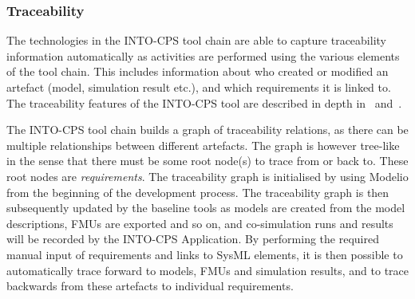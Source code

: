 \subsubsection{Traceability}
\label{sec:method:trace}

The technologies in the INTO-CPS tool chain are able to capture traceability information automatically as activities are performed using the various elements of the tool chain. This includes information about who created or modified an artefact (model, simulation result etc.), and which requirements it is linked to. The traceability features of the INTO-CPS tool are described in depth in~\cite{Pierce&18} and~\cite{Larsen&18a}.


The INTO-CPS tool chain builds a graph of traceability relations, as there can be multiple relationships between different artefacts. The graph is however tree-like in the sense that there must be some root node(s) to trace from or back to. These root nodes are \emph{requirements}. The traceability graph is initialised by using Modelio from the beginning of the development process. The traceability graph is then subsequently updated by the baseline tools as models are created from the model descriptions, FMUs are exported and so on, and co-simulation runs and results will be recorded by the INTO-CPS Application. By performing the required manual input of requirements and links to SysML elements, it is then possible to automatically trace forward to models, FMUs and simulation results, and to trace backwards from these artefacts to individual requirements.


